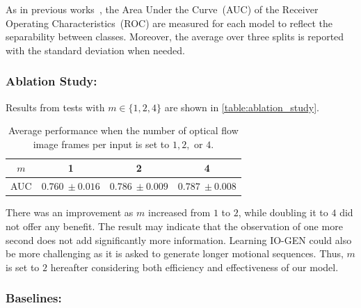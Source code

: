\documentclass[letterpaper]{article} %
\let\orgautoref\autoref
\renewcommand{\autoref}
{\def\equationautorefname{Equation}%
	\def\figureautorefname{Fig.}%
	\def\subfigureautorefname{Fig.}%
	\def\Itemautorefname{item}%
	\def\tableautorefname{Table}%
	\def\exerciseautorefname{Exercise}%
	\def\starexerciseautorefname{Exercise}%
	\def\sectionautorefname{Section}%
	\def\subsectionautorefname{Section}%
	\def\subsubsectionautorefname{Section}%
	\def\chapterautorefname{Section}%
	\def\partautorefname{Part}%
	\orgautoref}
\begin{document}
As in previous works~\citep{RVGDSBMK18}, the Area Under the Curve~(AUC) 
of the Receiver Operating Characteristics~(ROC) are measured for 
each model to reflect the separability between classes. Moreover, 
the average over three splits is reported with the standard 
deviation when needed.

\subsubsection{Ablation Study:}
\label{sec:ablation_study}
%
Results from tests with $m \in \{1, 2, 4\}$ are shown in
\autoref{table:ablation_study}.
%
\setlength{\tabcolsep}{0.5em} %
{\renewcommand{\arraystretch}{1.2}%
	\begin{table}
		\centering
		\begin{tabular}{|c|c|c|c|} 
			\hline
			$m$  &  1 & 2 & 4  \\ \hline\hline
			AUC & $0.760~\pm 0.016$ & $0.786~\pm 0.009$ & $0.787~\pm 0.008$ 
			\\ \hline
		\end{tabular}
		\caption{Average performance when the number of optical flow 
		image frames per input is set to $1, 2,$ or $4$.}
		\label{table:ablation_study}
	\end{table}
}%
There was an improvement as $m$ increased from $1$ to $2$,
while doubling it to $4$ did not offer any benefit. The result may
indicate that the observation of one more second does not add
significantly more information. Learning \mbox{IO-GEN} could also be more
challenging as it is asked to generate longer motional sequences.  Thus,
$m$ is set to $2$ hereafter considering both efficiency and
effectiveness of our model.


\subsubsection{Baselines:}
\label{sec:baselines}
\end{document}
